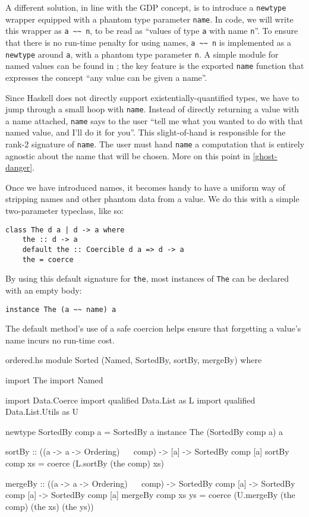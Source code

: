 \documentclass[format=sigplan, review=false, screen=true, 10pt]{acmart}
\begin{document}
A different solution, in line with the GDP concept, is to introduce a \texttt{newtype} wrapper equipped with
a phantom type parameter \texttt{name}.
In code, we will write this wrapper as \verb|a ~~ n|, to be read as
``values of type \texttt{a} with name \texttt{n}''. To ensure that there is no
run-time penalty for using names, \verb|a ~~ n| is implemented as a \texttt{newtype}
around \texttt{a}, with a phantom type parameter \texttt{n}. A simple module for named values
can be found in ; the key feature is the exported \texttt{name}
function that expresses the concept ``any value can be given a name''.

Since Haskell does not directly support existentially-quantified types, we have to jump through
a small hoop with \texttt{name}. Instead of directly returning a value with a name attached,
\texttt{name} says to the user ``tell me what you wanted to do with that named value,
and I'll do it for you''. This slight-of-hand is responsible for the rank-2
signature of \texttt{name}. The user must hand \texttt{name} a computation that is
entirely agnostic about the name that will be chosen. More on this point in \cref{ghost-danger}.

Once we have introduced names, it becomes handy to have a uniform way of stripping names
and other phantom data from a value. We do this with a simple two-parameter typeclass,
like so:
\begin{verbatim}
class The d a | d -> a where
    the :: d -> a
    default the :: Coercible d a => d -> a
    the = coerce
\end{verbatim}
By using this default signature for \texttt{the}, most instances of \texttt{The}
can be declared with an empty body:
\begin{verbatim}
instance The (a ~~ name) a
\end{verbatim}
The default method's use of a safe coercion helps ensure that forgetting a value's name 
incurs no run-time cost.

\begin{filecontents*}{ordered.hs}
module Sorted (Named, SortedBy, sortBy, mergeBy) where   

import The
import Named

import           Data.Coerce
import qualified Data.List       as L
import qualified Data.List.Utils as U

newtype SortedBy comp a = SortedBy a
instance The (SortedBy comp a) a
  
sortBy :: ((a -> a -> Ordering) ~~ comp)
       -> [a]
       -> SortedBy comp [a]
sortBy comp xs = coerce (L.sortBy (the comp) xs)

mergeBy :: ((a -> a -> Ordering) ~~ comp)
        -> SortedBy comp [a]
        -> SortedBy comp [a]
        -> SortedBy comp [a]
mergeBy comp xs ys =
  coerce (U.mergeBy (the comp) (the xs) (the ys))        
\end{filecontents*}
\end{document}
